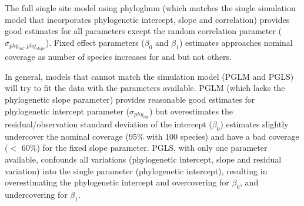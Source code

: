 \documentclass[12pt]{article}
\begin{document}
The full single site model using phyloglmm (which matches the single simulation model that incorporates phylogenetic intercept, slope and correlation) provides good estimates for all parameters except the random correlation parameter ($\sigma_{phy_{int},phy_{slope}}$). 
Fixed effect parameters ($\beta_0$ and $\beta_1$) estimates approaches nominal coverage as number of species increases for  and  but not others.

In general, models that cannot match the simulation model (PGLM and PGLS) will try to fit the data with the parameters available. 
PGLM (which lacks the phylogenetic slope parameter) provides reasonable good estimates for phylogenetic intercept parameter ($\sigma_{phy_{int}}$) but overestimates the residual/observation standard deviation of the intercept ($\beta_0$) estimates slightly undercover the nominal coverage (95\% with 100 species) and have a bad coverage ($<$ 60\%) for the fixed slope parameter.
PGLS, with only one parameter available, confounds all variations (phylogenetic intercept, slope and residual variation) into the single parameter (phylogenetic intercept), resulting in overestimating the phylogenetic intercept and overcovering for $\beta_0$, and undercovering for $\beta_1$.

\end{document}
